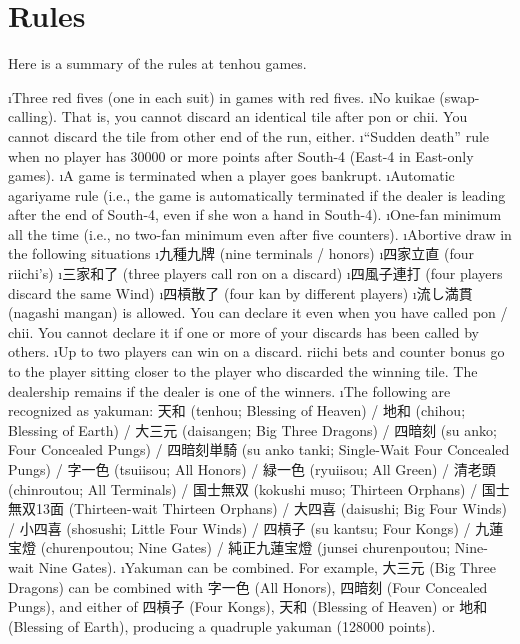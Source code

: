 \section{Rules}
Here is a summary of the rules at {\jap tenhou} games. 

\bi
\i Three red fives (one in each suit) in games with red fives.
\i No {\jap kuikae} (swap-calling). That is, you cannot discard an identical tile after {\jap pon} or {\jap chii}. You cannot discard the tile from other end of the run, either. 
\i ``Sudden death'' rule when no player has 30000 or more points after South-4 (East-4 in East-only games).
\i A game is terminated when a player goes bankrupt.
\i Automatic {\jap agariyame} rule (i.e., the game is automatically terminated if the dealer is leading after the end of South-4, even if she won a hand in South-4).
\i One-{\jap fan} minimum all the time (i.e., no two-{\jap fan} minimum even after five counters).
\i Abortive draw in the following situations
	\bi
	\i 九種九牌 (nine terminals / honors)
	\i 四家立直 (four {\jap riichi}'s)
	\i 三家和了 (three players call {\jap ron} on a discard)
	\i 四風子連打 (four players discard the same Wind)
	\i 四槓散了 (four {\jap kan} by different players)
	\ei
\i 流し満貫 ({\jap nagashi mangan}) is allowed. You can declare it even when you have called {\jap pon} / {\jap chii}. You cannot declare it if one or more of your discards has been called by others.
\i Up to two players can win on a discard. {\jap riichi} bets and counter bonus go to the player sitting closer to the player who discarded the winning tile. The dealership remains if the dealer is one of the winners.
\i The following are recognized as {\jap yakuman}: 
天和 ({\jap tenhou}; Blessing of Heaven) / 地和 ({\jap chihou}; Blessing of Earth) / 大三元 ({\jap daisangen}; Big Three Dragons) / 四暗刻 ({\jap su anko}; Four Concealed Pungs) / 四暗刻単騎 ({\jap su anko tanki}; Single-Wait Four Concealed Pungs) / 字一色 ({\jap tsuiisou}; All Honors) / 緑一色 ({\jap ryuiisou}; All Green) / 清老頭 ({\jap chinroutou}; All Terminals) / 国士無双 ({\jap kokushi muso}; Thirteen Orphans) / 国士無双13面 (Thirteen-wait Thirteen Orphans) / 大四喜 ({\jap daisushi}; Big Four Winds) / 小四喜 ({\jap shosushi}; Little Four Winds) / 四槓子 ({\jap su kantsu}; Four Kongs) / 九蓮宝燈 ({\jap churenpoutou}; Nine Gates) / 純正九蓮宝燈 ({\jap junsei churenpoutou}; Nine-wait Nine Gates).
\i {\jap Yakuman} can be combined. For example, 大三元 (Big Three Dragons) can be combined with 字一色 (All Honors), 四暗刻 (Four Concealed Pungs), and either of 四槓子 (Four Kongs), 天和 (Blessing of Heaven) or 地和 (Blessing of Earth), producing a quadruple {\jap yakuman} (128000 points). 
